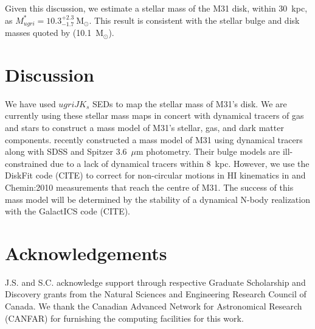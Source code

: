 \documentclass{iau}
\newcommand{\mnras}{MNRAS}       %
\begin{document}
Given this discussion, we estimate a stellar mass of the M31 disk, within $30$~kpc, as $M_{ugri}^{*} = 10.3^{+2.3}_{-1.7}~\mathrm{M}_\odot$.
This result is consistent with the stellar bulge and disk masses quoted by \cite{Tamm:2012} (10.1~$\mathrm{M}_\odot$).

\section{Discussion}

We have used $ugriJK_s$ SEDs to map the stellar mass of M31's disk.
We are currently using these stellar mass maps in concert with dynamical tracers of gas and stars to construct a mass model of M31's stellar, gas, and dark matter components.
\cite{Tamm:2012} recently constructed a mass model of M31 using dynamical tracers along with SDSS and Spitzer 3.6~$\mu$m photometry.
Their bulge models are ill-constrained due to a lack of dynamical tracers within 8~kpc.
However, we use the DiskFit code (CITE) to correct for non-circular motions in HI kinematics in \cite{Saglia:2010} and {Chemin:2010} measurements that reach the centre of M31.
The success of this mass model will be determined by the stability of a dynamical N-body realization with the GalactICS code (CITE).

\section*{Acknowledgements}

\noindent J.S. and S.C. acknowledge support through respective Graduate Scholarship and Discovery grants from the Natural Sciences and Engineering Research Council of Canada.
We thank the Canadian Advanced Network for Astronomical Research (CANFAR) for furnishing the computing facilities for this work.





\end{document}
